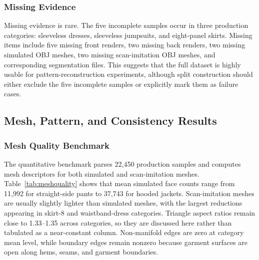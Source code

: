 \documentclass[pdflatex,sn-mathphys-num]{sn-jnl}
\begin{document}
\subsubsection{Missing Evidence}

Missing evidence is rare. The five incomplete samples occur in three production categories: sleeveless dresses, sleeveless jumpsuits, and eight-panel skirts. Missing items include five missing front renders, two missing back renders, two missing simulated OBJ meshes, two missing scan-imitation OBJ meshes, and corresponding segmentation files. This suggests that the full dataset is highly usable for pattern-reconstruction experiments, although split construction should either exclude the five incomplete samples or explicitly mark them as failure cases.

\subsection{Mesh, Pattern, and Consistency Results}

\subsubsection{Mesh Quality Benchmark}

The quantitative benchmark parses 22,450 production samples and computes mesh descriptors for both simulated and scan-imitation meshes. Table~\ref{tab:meshquality} shows that mean simulated face counts range from 11,992 for straight-side pants to 37,743 for hooded jackets. Scan-imitation meshes are usually slightly lighter than simulated meshes, with the largest reductions appearing in skirt-8 and waistband-dress categories. Triangle aspect ratios remain close to 1.33--1.35 across categories, so they are discussed here rather than tabulated as a near-constant column. Non-manifold edges are zero at category mean level, while boundary edges remain nonzero because garment surfaces are open along hems, seams, and garment boundaries.
\end{document}

